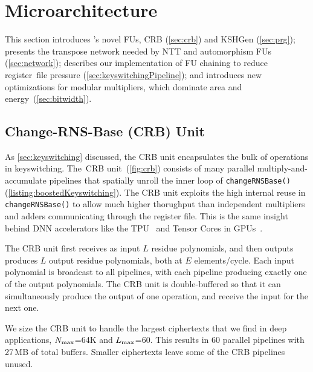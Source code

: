 \section{Microarchitecture}\label{sec:architecture}

This section introduces \name's novel FUs, CRB (\autoref{sec:crb}) and KSHGen (\autoref{sec:prg});
presents the transpose network needed by NTT and automorphism FUs (\autoref{sec:network});
describes our implementation of FU chaining to reduce register~file pressure 
(\autoref{sec:keyswitchingPipeline});
and introduces new optimizations for modular multipliers, which dominate area 
and energy~(\autoref{sec:bitwidth}).

\subsection{Change-RNS-Base (CRB) Unit}\label{sec:crb}

As \autoref{sec:keyswitching} discussed, the CRB unit
encapsulates the bulk of operations in keyswitching.
The~CRB unit~(\autoref{fig:crb}) consists of many parallel multiply-and-accumulate pipelines that
spatially unroll the inner loop of \verb!changeRNSBase()! (\autoref{listing:boostedKeyswitching}).
The CRB unit exploits the high internal reuse in \verb!changeRNSBase()! to allow much higher thorughput
than independent multipliers and adders communicating through the register file.
This is the same insight behind DNN accelerators like the TPU~\cite{jouppi:isca17:tpu}
and Tensor Cores in GPUs~\cite{choquette2021nvidia}.

The CRB unit first receives as input $L$ residue polynomials, and then outputs
produces $L$ output residue polynomials, both at $E$ elements/cycle.
Each input polynomial is broadcast to all pipelines, with each pipeline
producing exactly one of the output polynomials.
The CRB unit is double-buffered so that it can simultaneously produce the
output of one operation, and receive the input for the next one.

We size the CRB unit to handle the largest ciphertexts that we find in deep
applications, $N_{\textrm{max}}$=64K and $L_{\textrm{max}}$=60.
This results in 60 parallel pipelines with 27\,MB of total buffers.
Smaller ciphertexts leave some of the CRB pipelines unused.

\figCRB


